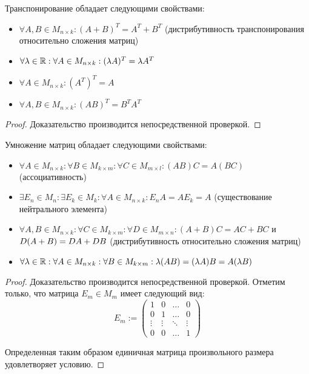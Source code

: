     \begin{proposition}
    	Транспонирование обладает следующими свойствами:
    	\begin{itemize}
    		\item $\forall A, B \in M_{n \times k}: (A + B)^T = A^T + B^T$ (дистрибутивность транспонирования относительно сложения матриц)
    		\item $\forall \lambda \in \mathbb{R}: \forall A \in M_{n \times k}: (\lambda A)^T = \lambda A^T$
    		\item $\forall A \in M_{n \times k}: (A^T)^T = A$
    		\item $\forall A, B \in M_{n \times k}: (AB)^T = B^T A^T$
    	\end{itemize}
    \end{proposition}
    
    \begin{proof}
    	Доказательство производится непосредственной проверкой.
    \end{proof}
    
    \begin{proposition}
    	Умножение матриц обладает следующими свойствами:
    	
    	\begin{itemize}
    		\item $\forall A \in M_{n \times k}: \forall B \in M_{k \times m}: \forall C \in M_{m \times l}: (AB)C = A(BC)$ (ассоциативность)
    		\item $\exists E_n \in  M_{n}: \exists E_k \in M_{k}: \forall A \in M_{n \times k} : E_nA = AE_k = A$ (существование нейтрального элемента)
    		\item $\forall A, B \in M_{n \times k}: \forall C \in M_{k \times m}: \forall D \in M_{m \times n}: (A+B)C = AC + BC$ и $D(A+B) \hm= DA + DB$ (дистрибутивность относительно сложения матриц)
    		\item $\forall \lambda \in \mathbb{R}: \forall A \in M_{n \times k}: \forall B \in M_{k \times m}: \lambda (AB) = (\lambda A)B = A(\lambda B)$
    	\end{itemize}
    \end{proposition}
    
    \begin{proof}
    	Доказательство производится непосредственной проверкой. Отметим только, что матрица $E_m \in M_m$ имеет следующий вид:
    	\[E_m := \begin{pmatrix}
    	1 & 0 & \dots & 0\\
    	0 & 1 & \dots & 0\\
    	\vdots & \vdots & \ddots & \vdots\\
    	0 & 0 & \dots & 1
    	\end{pmatrix}\]
    	
    	Определенная таким образом единичная матрица произвольного размера удовлетворяет условию.
        \pagebreak
    \end{proof}
    